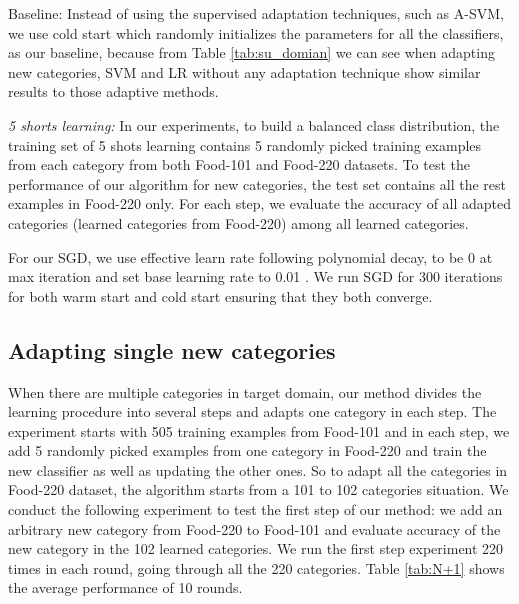 Baseline: Instead of using the supervised adaptation techniques, such as A-SVM, we use cold start which randomly initializes the parameters for all the classifiers, as our baseline, because from Table \ref{tab:su_domian} we can see when adapting new categories, SVM and LR without any adaptation technique show similar results to those adaptive methods. %

\emph{5 shorts learning:} In our experiments, to build a balanced class distribution, the training set of 5 shots learning contains 5 randomly picked training examples from each category from both Food-101 and Food-220 datasets. To test the performance of our algorithm for new categories, the test set contains all the rest examples in Food-220 only. For each step, we evaluate the accuracy of all adapted categories (learned categories from Food-220) among all learned categories.

For our SGD, we use effective learn rate following polynomial decay, to be 0 at max iteration and set base learning rate to 0.01 \cite{jia2014caffe}. We run SGD for 300 iterations for both warm start and cold start ensuring that they both converge.

\subsection{Adapting single new categories}
When there are multiple categories in target domain, our method divides the learning procedure into several steps and adapts one category in each step. The experiment starts with 505 training examples from Food-101 and in each step, we add 5 randomly picked examples from one category in Food-220 and train the new classifier as well as updating the other ones. So to adapt all the categories in Food-220 dataset, the algorithm starts from a 101 to 102 categories situation. We conduct the following experiment to test the first step of our method: we add an arbitrary new category from Food-220 to Food-101 and evaluate accuracy of the new category in the 102 learned categories. We run the first step experiment 220 times in each round, going through all the 220 categories. Table \ref{tab:N+1} shows the average performance of 10 rounds.


